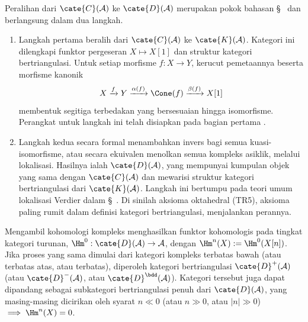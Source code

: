 Peralihan dari $\cate{C}(\mathcal{A})$ ke $\cate{D}(\mathcal{A})$ merupakan
pokok bahasan \S~ dan berlangsung dalam
dua langkah.
\begin{enumerate}
	\item Langkah pertama beralih dari $\cate{C}(\mathcal{A})$ ke
	$\cate{K}(\mathcal{A})$. Kategori ini dilengkapi funktor pergeseran
	$X\mapsto X[1]$ dan struktur kategori bertriangulasi. Untuk setiap
	morfisme $f:X\to Y$, kerucut pemetaannya beserta morfisme kanonik
	\[
	  X \xrightarrow{f} Y \xrightarrow{\alpha(f)} \Cone(f)
	  \xrightarrow{\beta(f)} X[1]
	\]
	membentuk segitiga terbedakan yang bersesuaian hingga isomorfisme. Perangkat
	untuk langkah ini telah disiapkan pada bagian pertama .
	\item Langkah kedua secara formal menambahkan invers bagi semua
	kuasi-isomorfisme, atau secara ekuivalen menolkan semua kompleks asiklik,
	melalui lokalisasi. Hasilnya ialah $\cate{D}(\mathcal{A})$, yang mempunyai
	kumpulan objek yang sama dengan $\cate{C}(\mathcal{A})$ dan mewarisi
	struktur kategori bertriangulasi dari $\cate{K}(\mathcal{A})$. Langkah ini
	bertumpu pada teori umum lokalisasi Verdier dalam
	\S~. Di sinilah aksioma
	oktahedral (TR5), aksioma paling rumit dalam definisi kategori
	bertriangulasi, menjalankan perannya.
\end{enumerate}

Mengambil kohomologi kompleks menghasilkan funktor kohomologis pada tingkat
kategori turunan, $\Hm^0:\cate{D}(\mathcal{A})\to\mathcal{A}$, dengan
$\Hm^n(X):=\Hm^0(X[n])$. Jika proses yang sama dimulai dari kategori kompleks
terbatas bawah (atau terbatas atas, atau terbatas), diperoleh kategori
bertriangulasi $\cate{D}^+(\mathcal{A})$ (atau
$\cate{D}^-(\mathcal{A})$, atau $\cate{D}^{\bdd}(\mathcal{A})$). Kategori
tersebut juga dapat dipandang sebagai subkategori bertriangulasi penuh dari
$\cate{D}(\mathcal{A})$, yang masing-masing dicirikan oleh syarat
$n\ll0$ (atau $n\gg0$, atau $|n|\gg0$) $\implies\Hm^n(X)=0$.

